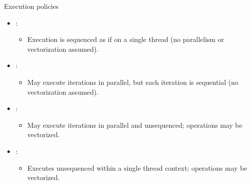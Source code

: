 \begin{frame}[t,fragile]{Execution policies}
\begin{itemize}
  \item {}:
    \begin{itemize}
      \item Execution is sequenced as if on a single thread (no parallelism or vectorization assumed).
    \end{itemize}
  \item {}:
    \begin{itemize}
      \item May execute iterations in parallel, but each iteration is sequential (no vectorization assumed).
    \end{itemize}
  \item {}:
    \begin{itemize}
      \item May execute iterations in parallel and unsequenced; operations may be vectorized.
    \end{itemize}
  \item {}:
    \begin{itemize}
      \item Executes unsequenced within a single thread context; operations may be vectorized.
    \end{itemize}
\end{itemize}
\end{frame}


